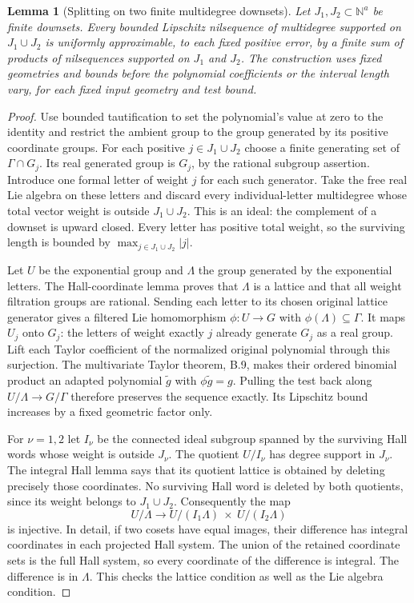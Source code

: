 \documentclass[11pt]{article}
\newtheorem{lemma}[theorem]{Lemma}
\newcommand{\N}{\mathbb N}
\begin{document}
\begin{lemma}[Splitting on two finite multidegree downsets]
Let $J_1,J_2\subset\N^a$ be finite downsets. Every bounded Lipschitz
nilsequence of multidegree supported on $J_1\cup J_2$ is uniformly
approximable, to each fixed positive error, by a finite sum of products
of nilsequences supported on $J_1$ and $J_2$. The construction uses
fixed geometries and bounds before the polynomial coefficients or the
interval length vary, for each fixed input geometry and test bound.
\end{lemma}
\begin{proof}
Use bounded tautification to set the polynomial's value at zero to the
identity and restrict the ambient group to the group generated by its
positive coordinate groups. For each positive $j\in J_1\cup J_2$ choose
a finite generating set of $\Gamma\cap G_j$. Its real generated group
is $G_j$, by the rational subgroup assertion. Introduce one formal
letter of weight $j$ for each such generator. Take the free real Lie
algebra on these letters and discard every individual-letter multidegree
whose total vector weight is outside $J_1\cup J_2$. This is an ideal:
the complement of a downset is upward closed. Every letter has positive
total weight, so the surviving length is bounded by
$\max_{j\in J_1\cup J_2}|j|$.

Let $U$ be the exponential group and $\Lambda$ the group generated by
the exponential letters. The Hall-coordinate lemma proves that
$\Lambda$ is a lattice and that all weight filtration groups are
rational. Sending each letter to its chosen original lattice generator
gives a filtered Lie homomorphism $\phi:U\to G$ with
$\phi(\Lambda)\subseteq\Gamma$. It maps $U_j$ onto $G_j$: the letters
of weight exactly $j$ already generate $G_j$ as a real group. Lift each
Taylor coefficient of the normalized original polynomial through this
surjection. The multivariate Taylor theorem, B.9, makes their ordered
binomial product an adapted polynomial $\widetilde g$ with
$\phi\widetilde g=g$. Pulling the test back along
$U/\Lambda\to G/\Gamma$ therefore preserves the sequence exactly.
Its Lipschitz bound increases by a fixed geometric factor only.

For $\nu=1,2$ let $I_\nu$ be the connected ideal subgroup spanned by
the surviving Hall words whose weight is outside $J_\nu$. The quotient
$U/I_\nu$ has degree support in $J_\nu$. The integral Hall lemma says
that its quotient lattice is obtained by deleting precisely those
coordinates. No surviving Hall word is deleted by both quotients, since
its weight belongs to $J_1\cup J_2$. Consequently the map
\[
 U/\Lambda\longrightarrow
 U/(I_1\Lambda)\ \times\ U/(I_2\Lambda)
\]
is injective. In detail, if two cosets have equal images, their difference
has integral coordinates in each projected Hall system. The union of
the retained coordinate sets is the full Hall system, so every coordinate
of the difference is integral. The difference is in $\Lambda$.
This checks the lattice condition as well as the Lie algebra condition.


\end{proof}
\end{document}
